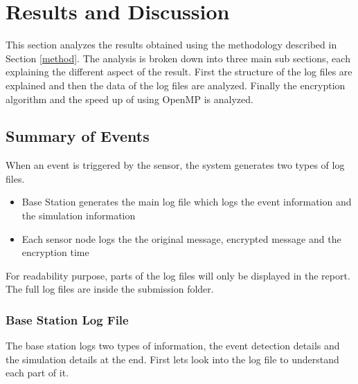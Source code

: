 \documentclass[conference]{IEEEtran}
\begin{document}
	\section{Results and Discussion}
	
	This section analyzes the results obtained using the methodology described in Section \ref{method}. The analysis is broken down into three main sub sections, each explaining the different aspect of the result. First the structure of the log files are explained and then the data of the log files are analyzed. Finally the encryption algorithm and the speed up of using OpenMP is analyzed.
	
	\subsection{Summary of Events}
	
	When an event is triggered by the sensor, the system generates two types of log files. 

	\begin{itemize}
		\item Base Station generates the main log file which logs the event information and the simulation information
		\item Each sensor node logs the the original message, encrypted message and the encryption time
	\end{itemize}

	For readability purpose, parts of the log files will only be displayed in the report. The full log files are inside the submission folder.

	\subsubsection{Base Station Log File}
	
	The base station logs two types of information, the event detection details and the simulation details at the end. First lets look into the log file to understand each part of it. 
	
\end{document}
